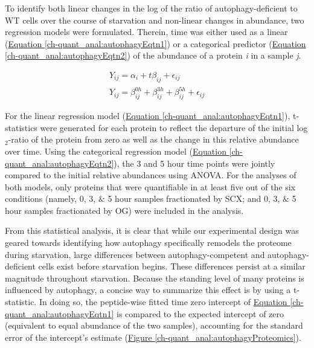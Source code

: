 To identify both linear changes in the log of the ratio of autophagy-deficient to WT cells over the course of starvation and non-linear changes in abundance, two regression models were formulated. Therein, time was either used as a linear (\hyperref[ch-quant_anal:autophagyEqtn1]{Equation \ref{ch-quant_anal:autophagyEqtn1}}) or a categorical predictor (\hyperref[ch-quant_anal:autophagyEqtn2]{Equation \ref{ch-quant_anal:autophagyEqtn2}}) of the abundance of a protein \textit{i} in a sample \textit{j}.

\begin{subequations}
\begin{align}
Y_{ij} = \alpha_{i} + t\beta_{ij} + \epsilon_{ij} \label{ch-quant_anal:autophagyEqtn1}\\
Y_{ij} = \beta^{0h}_{ij} + \beta^{3h}_{ij} + \beta^{5h}_{ij} + \epsilon_{ij} \label{ch-quant_anal:autophagyEqtn2}
\end{align}
\end{subequations}

For the linear regression model (\hyperref[ch-quant_anal:autophagyEqtn1]{Equation \ref{ch-quant_anal:autophagyEqtn1}}), t-statistics were generated for each protein to reflect the departure of the initial log$_2$-ratio of the protein from zero as well as the change in this relative abundance over time. Using the categorical regression model (\hyperref[ch-quant_anal:autophagyEqtn2]{Equation \ref{ch-quant_anal:autophagyEqtn2}}), the 3  and 5 hour time points were jointly compared to the initial relative abundances using ANOVA. For the analyses of both models, only proteins that were quantifiable in at least five out of the six conditions (namely, 0, 3, $\&$ 5 hour samples fractionated by SCX; and 0, 3, $\&$ 5 hour samples fractionated by OG) were included in the analysis. 

From this statistical analysis, it is clear that while our experimental design was geared towards identifying how autophagy specifically remodels the proteome during starvation, large differences between autophagy-competent and autophagy-deficient cells exist before starvation begins. These differences persist at a similar magnitude throughout starvation.  Because the standing level of many proteins is influenced by autophagy, a concise way to summarize this effect is by using a t-statistic. In doing so, the peptide-wise fitted time zero intercept of \hyperref[ch-quant_anal:autophagyEqtn1]{Equation \ref{ch-quant_anal:autophagyEqtn1}} is compared to the expected intercept of zero (equivalent to equal abundance of the two samples), accounting for the standard error of the intercept's estimate (\hyperref[ch-quant_anal:autophagyProteomics]{Figure \ref{ch-quant_anal:autophagyProteomics}}).

